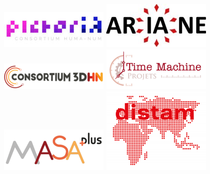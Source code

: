 \documentclass[
  letterpaper,
  DIV=11,
  numbers=noendperiod]{scrreport}
\begin{document}
\begin{figure}
\begin{minipage}{0.33\linewidth}
\includegraphics{IMG/Pictoria-200x70.jpg}\end{minipage}%
%
\begin{minipage}{0.33\linewidth}
\includegraphics{IMG/Logo_ARIANE-200x86.jpg}\end{minipage}%
%
\begin{minipage}{0.33\linewidth}
\includegraphics{IMG/logo-3DHN-200x52.png}\end{minipage}%
\newline
\begin{minipage}{0.33\linewidth}
\includegraphics{IMG/logo-PTM-png-200x80.png}\end{minipage}%
%
\begin{minipage}{0.33\linewidth}
\includegraphics{IMG/logo_MASAplus-200x81.png}\end{minipage}%
%
\begin{minipage}{0.33\linewidth}
\includegraphics{IMG/LOGO-DISTAM-sans-texte-200x158.png}\end{minipage}%

\end{figure}
\end{document}

